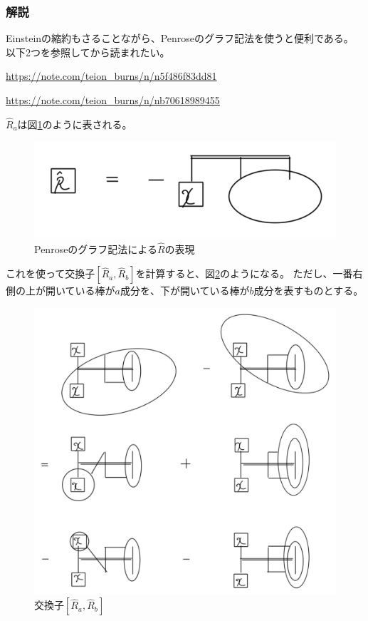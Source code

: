\documentclass{jsarticle}
\begin{document}
\subsubsection*{解説}

Einsteinの縮約もさることながら、Penroseのグラフ記法を使うと便利である。
以下2つを参照してから読まれたい。

\href{ペンローズのグラフ記法によるベクトル解析の公式の表現 | 低音}{https://note.com/teion_burns/n/n5f486f83dd81}

\href{ペンローズのグラフ記法による完全反対称レヒチビタテンソルの公式の表現 | 低音}{https://note.com/teion_burns/n/nb70618989455}

$\hat{R}_a$は図\ref*{fig:Rhat}のように表される。

\begin{figure}
    \centering
    \includegraphics{Rhat.png}
    \caption{Penroseのグラフ記法による$\hat{R}$の表現}
    \label{fig:Rhat}
\end{figure}

これを使って交換子$[\hat{R}_a,\hat{R}_b]$を計算すると、図\ref*{fig:Rhat commutator}のようになる。
ただし、一番右側の上が開いている棒が$a$成分を、下が開いている棒が$b$成分を表すものとする。

\begin{figure}
    \centering
    \includegraphics{Rhat-commutator.png}
    \caption{交換子$[\hat{R}_a,\hat{R}_b]$}
    \label{fig:Rhat commutator}
\end{figure}
\end{document}
